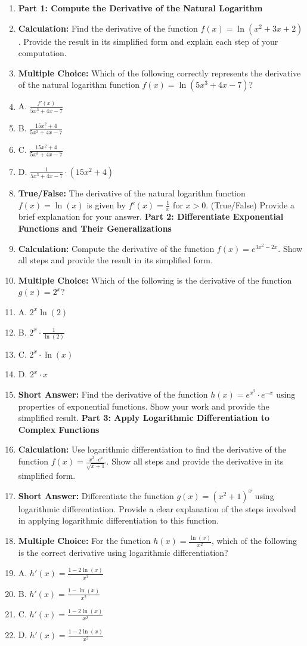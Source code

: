 \begin{enumerate}
    \item \textbf{Part 1: Compute the Derivative of the Natural Logarithm}
    \item \textbf{Calculation:} Find the derivative of the function $f(x) = \ln(x^2 + 3x + 2)$. Provide the result in its simplified form and explain each step of your computation.
    \item \textbf{Multiple Choice:} Which of the following correctly represents the derivative of the natural logarithm function $f(x) = \ln(5x^3 + 4x - 7)$?
    \item A. $\frac{f'(x)}{5x^3 + 4x - 7}$
    \item B. $\frac{15x^2 + 4}{5x^3 + 4x - 7}$
    \item C. $\frac{15x^2 + 4}{5x^3 + 4x - 7}$
    \item D. $\frac{1}{5x^3 + 4x - 7} \cdot (15x^2 + 4)$
    \item \textbf{True/False:} The derivative of the natural logarithm function $f(x) = \ln(x)$ is given by $f'(x) = \frac{1}{x}$ for $x > 0$. (True/False) Provide a brief explanation for your answer. \textbf{Part 2: Differentiate Exponential Functions and Their Generalizations}
    \item \textbf{Calculation:} Compute the derivative of the function $f(x) = e^{3x^2 - 2x}$. Show all steps and provide the result in its simplified form.
    \item \textbf{Multiple Choice:} Which of the following is the derivative of the function $g(x) = 2^x$?
    \item A. $2^x \ln(2)$
    \item B. $2^x \cdot \frac{1}{\ln(2)}$
    \item C. $2^x \cdot \ln(x)$
    \item D. $2^x \cdot x$
    \item \textbf{Short Answer:} Find the derivative of the function $h(x) = e^{x^2} \cdot e^{-x}$ using properties of exponential functions. Show your work and provide the simplified result. \textbf{Part 3: Apply Logarithmic Differentiation to Complex Functions}
    \item \textbf{Calculation:} Use logarithmic differentiation to find the derivative of the function $f(x) = \frac{x^2 \cdot e^{x}}{\sqrt{x + 1}}$. Show all steps and provide the derivative in its simplified form.
    \item \textbf{Short Answer:} Differentiate the function $g(x) = (x^2 + 1)^x$ using logarithmic differentiation. Provide a clear explanation of the steps involved in applying logarithmic differentiation to this function.
    \item \textbf{Multiple Choice:} For the function $h(x) = \frac{\ln(x)}{x^2}$, which of the following is the correct derivative using logarithmic differentiation?
    \item A. $h'(x) = \frac{1 - 2 \ln(x)}{x^3}$
    \item B. $h'(x) = \frac{1 - \ln(x)}{x^2}$
    \item C. $h'(x) = \frac{1 - 2 \ln(x)}{x^2}$
    \item D. $h'(x) = \frac{1 - 2 \ln(x)}{x^2}$
\end{enumerate}

